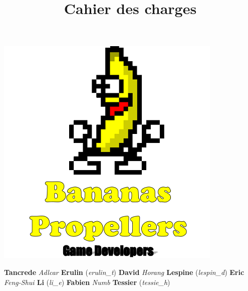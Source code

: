 \documentclass[12pt,a4paper]{report}
\title{Cahier des charges}
\begin{document}
\renewcommand\thechapter{\Roman{chapter}}
\thispagestyle{empty}
\begin{center}
{\fontsize{30}{32}{\textbf{\textcolor{red}{Epit'S'cape}}}}
\par
\vspace*{0.5cm}
{}
\par
{\fontsize{15}{18}{\textcolor{jaune}{\textbf{\today}}}}
\end{center}
\vspace*{0.5cm}

\begin{center}
\includegraphics{Logo.png}
\end{center}

\begin{center}
\vspace*{0.5cm}
\par
\fontsize{16}{20pt}
\textbf{Tancrede}
\emph{\textcolor{jaune}{Adlcar }}
\textbf{Erulin}
(\emph{erulin\_t})
\newline
\textbf{David}
\emph{\textcolor{jaune}{Horang }}
\textbf{Lespine}
(\emph{lespin\_d})
\newline
\textbf{Eric}
\emph{\textcolor{jaune}{Feng-Shui }}
\textbf{Li}
(\emph{li\_e})
\newline
\textbf{Fabien}
\emph{\textcolor{jaune}{Numb }}
\textbf{Tessier}
(\emph{tessie\_h})
\newline
\vspace*{1cm}
\end{center}
\end{document}
